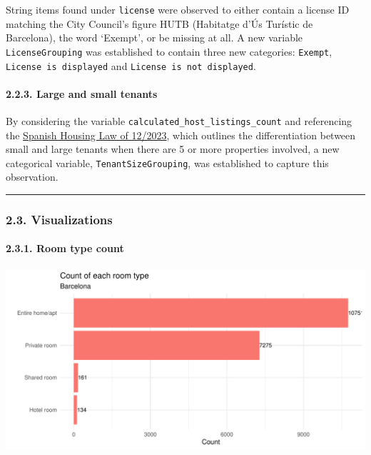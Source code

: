 \documentclass[
]{article}
\begin{document}
String items found under \texttt{license} were observed to either
contain a license ID matching the City Council's figure HUTB (Habitatge
d'Ús Turístic de Barcelona), the word `Exempt', or be missing at all. A
new variable \texttt{LicenseGrouping} was established to contain three
new categories: \texttt{Exempt}, \texttt{License\ is\ displayed} and
\texttt{License\ is\ not\ displayed}.

\hypertarget{large-and-small-tenants}{%
\paragraph{2.2.3. Large and small
tenants}\label{large-and-small-tenants}}

By considering the variable \texttt{calculated\_host\_listings\_count}
and referencing the
\href{https://www.boe.es/buscar/act.php?id=BOE-A-2023-12203}{Spanish
Housing Law of 12/2023}, which outlines the differentiation between
small and large tenants when there are 5 or more properties involved, a
new categorical variable, \texttt{TenantSizeGrouping}, was established
to capture this observation.

\begin{center}\rule{0.5\linewidth}{0.5pt}\end{center}

\hypertarget{visualizations}{%
\subsubsection{2.3. Visualizations}\label{visualizations}}

\hypertarget{room-type-count}{%
\paragraph{2.3.1. Room type count}\label{room-type-count}}

\begin{center}\includegraphics{Barcelona-AirBnB-Insights_files/figure-latex/plot1-1} \end{center}
\end{document}
